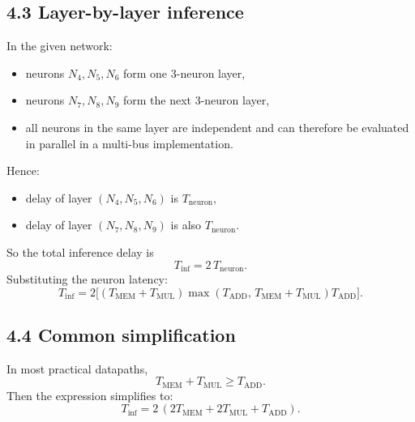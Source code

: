 \documentclass[11pt,a4paper]{article}
\begin{document}
\subsection*{4.3 Layer-by-layer inference}
In the given network:
\begin{itemize}
  \item neurons $N_4,N_5,N_6$ form one 3-neuron layer,
  \item neurons $N_7,N_8,N_9$ form the next 3-neuron layer,
  \item all neurons in the same layer are independent and can therefore be evaluated in parallel in a multi-bus implementation.
\end{itemize}

Hence:
\begin{itemize}
  \item delay of layer $(N_4,N_5,N_6)$ is $T_{\text{neuron}}$,
  \item delay of layer $(N_7,N_8,N_9)$ is also $T_{\text{neuron}}$.
\end{itemize}

So the total inference delay is
\[
\boxed{
T_{\text{inf}}=2\,T_{\text{neuron}}.
}
\]
Substituting the neuron latency:
\[
\boxed{
T_{\text{inf}}
=
2\Big[
(T_{\text{MEM}}+T_{\text{MUL}})
\max(T_{\text{ADD}},\,T_{\text{MEM}}+T_{\text{MUL}})
T_{\text{ADD}}
\Big].
}
\]

\subsection*{4.4 Common simplification}
In most practical datapaths,
\[
T_{\text{MEM}}+T_{\text{MUL}} \ge T_{\text{ADD}}.
\]
Then the expression simplifies to:
\[
\boxed{
T_{\text{inf}} = 2\,(2T_{\text{MEM}}+2T_{\text{MUL}}+T_{\text{ADD}}).
}
\]
\end{document}
